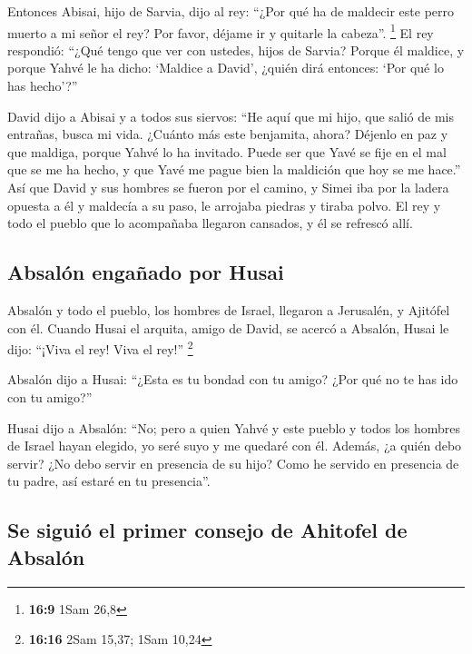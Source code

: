 \begin{paracol}{2}
 Entonces Abisai, hijo de Sarvia, dijo al rey: ``¿Por qué
ha de maldecir este perro muerto a mi señor el rey? Por favor, déjame ir
y quitarle la cabeza''. \footnote{\textbf{16:9} 1Sam 26,8}
 El rey respondió: ``¿Qué tengo que ver con ustedes,
hijos de Sarvia? Porque él maldice, y porque Yahvé le ha dicho: `Maldice
a David', ¿quién dirá entonces: `Por qué lo has hecho'?''

 David dijo a Abisai y a todos sus siervos: ``He aquí que
mi hijo, que salió de mis entrañas, busca mi vida. ¿Cuánto más este
benjamita, ahora? Déjenlo en paz y que maldiga, porque Yahvé lo ha
invitado.  Puede ser que Yavé se fije en el mal que se me
ha hecho, y que Yavé me pague bien la maldición que hoy se me hace.''
 Así que David y sus hombres se fueron por el camino, y
Simei iba por la ladera opuesta a él y maldecía a su paso, le arrojaba
piedras y tiraba polvo.  El rey y todo el pueblo que lo
acompañaba llegaron cansados, y él se refrescó allí.

\hypertarget{absaluxf3n-engauxf1ado-por-husai}{%
\subsection{Absalón engañado por
Husai}\label{absaluxf3n-engauxf1ado-por-husai}}

 Absalón y todo el pueblo, los hombres de Israel,
llegaron a Jerusalén, y Ajitófel con él.  Cuando Husai el
arquita, amigo de David, se acercó a Absalón, Husai le dijo: ``¡Viva el
rey! Viva el rey!'' \footnote{\textbf{16:16} 2Sam 15,37; 1Sam 10,24}

 Absalón dijo a Husai: ``¿Esta es tu bondad con tu amigo?
¿Por qué no te has ido con tu amigo?''

 Husai dijo a Absalón: ``No; pero a quien Yahvé y este
pueblo y todos los hombres de Israel hayan elegido, yo seré suyo y me
quedaré con él.  Además, ¿a quién debo servir? ¿No debo
servir en presencia de su hijo? Como he servido en presencia de tu
padre, así estaré en tu presencia''.

\hypertarget{se-siguiuxf3-el-primer-consejo-de-ahitofel-de-absaluxf3n}{%
\subsection{Se siguió el primer consejo de Ahitofel de
Absalón}\label{se-siguiuxf3-el-primer-consejo-de-ahitofel-de-absaluxf3n}}


\end{paracol}
